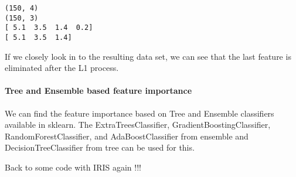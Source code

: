 \documentclass{article}
\begin{document}
    \begin{Verbatim}[commandchars=\\\{\}]
(150, 4)
(150, 3)
[ 5.1  3.5  1.4  0.2]
[ 5.1  3.5  1.4]
    \end{Verbatim}

    If we closely look in to the resulting data set, we can see that the
last feature is eliminated after the L1 process.

\paragraph{Tree and Ensemble based feature importance}

We can find the feature importance based on Tree and Ensemble
classifiers available in sklearn. The ExtraTreesClassifier,
GradientBoostingClassifier, RandomForestClassifier, and
AdaBoostClassifier from ensemble and DecisionTreeClassifier from tree
can be used for this.

Back to some code with IRIS again !!!
\end{document}
